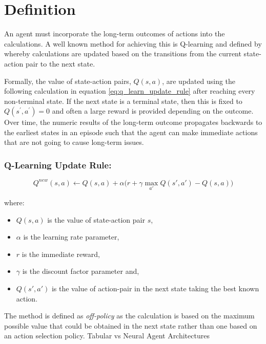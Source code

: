 \documentclass{article}
\title{}
\begin{document}
\maketitle
\section{Definition}
\label{loc:definition}
An agent must incorporate the long-term outcomes of actions into the calculations. A well known method for achieving this is Q-learning and defined by \cite{suttonReinforcementLearningIntroduction2018} whereby calculations are updated based on the transitions from the current state-action pair to the next state.

Formally, the value of state-action pairs, $Q(s,a)$, are updated using the following calculation in equation \autoref{eq:q_learn_update_rule} after reaching every non-terminal state. If the next state is a terminal state, then this is fixed to $Q(s^\prime,a^\prime)=0$ and often a large reward is provided depending on the outcome. Over time, the numeric results of the long-term outcome propagates backwards to the earliest states in an episode such that the agent can make immediate actions that are not going to cause long-term issues. 
\subsubsection{Q-Learning Update Rule:}
\label{loc:definition.q:learning_update_rule:}
\begin{equation}
\label{eq:q_learn_update_rule}
Q^{new}(s,a)\leftarrow Q(s,a) + \alpha {\bigg (} r + \gamma \max_{a'}Q(s',a') - Q(s,a) {\bigg )}
\end{equation}

where:
\begin{itemize}
\item $Q(s,a)$ is the value of state-action pair $s$,
\item $\alpha$ is the learning rate parameter,
\item $r$ is the immediate reward,
\item $\gamma$ is the discount factor parameter and,
\item $Q(s', a')$ is the value of action-pair in the next state taking the best known action.
\end{itemize}

The method is defined as \emph{off-policy} as the calculation is based on the maximum possible value that could be obtained in the next state rather than one based on an action selection policy. 
Tabular vs Neural Agent Architectures\printbibliography
\end{document}
